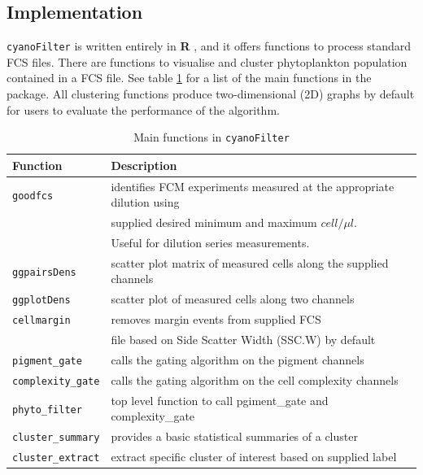 \documentclass[a4paper,12pt]{extarticle}
\begin{document}
\subsection*{Implementation}

\texttt{cyanoFilter} is written entirely in \textbf{R} \citep{r:2016}, and it offers functions to process standard FCS files. There are functions to visualise and cluster phytoplankton population contained in a FCS file. See table \ref{table:func} for a list of the main functions in the package. All clustering functions produce two-dimensional (2D) graphs by default for users to evaluate the performance of the algorithm.

\begin{table}[t] 
	\centering
	\begin{tabular}{ll}
	\hline
	Function & Description \\
	\hline
	\texttt{goodfcs} & identifies FCM experiments measured at the appropriate dilution using \\
	& supplied desired minimum and maximum $cell/\mu l$.\\ 
	& Useful for dilution series measurements.\\
	\texttt{ggpairsDens} & scatter plot matrix of measured cells along the supplied channels\\
	\texttt{ggplotDens} & scatter plot of measured cells along two channels\\
	\texttt{cellmargin} & removes margin events from supplied FCS\\ & file based on Side Scatter Width (SSC.W) by default\\
	\texttt{pigment\_gate} & calls the gating algorithm on the pigment channels\\
	\texttt{complexity\_gate} & calls the gating algorithm on the cell complexity channels\\
	\texttt{phyto\_filter} & top level function to call pgiment\_gate and complexity\_gate\\
	\texttt{cluster\_summary} & provides a basic statistical summaries of a cluster\\
	\texttt{cluster\_extract} & extract specific cluster of interest based on supplied label\\
	\hline
	\end{tabular}
\caption{Main functions in \texttt{cyanoFilter}}
\label{table:func}
\end{table}
\end{document}

